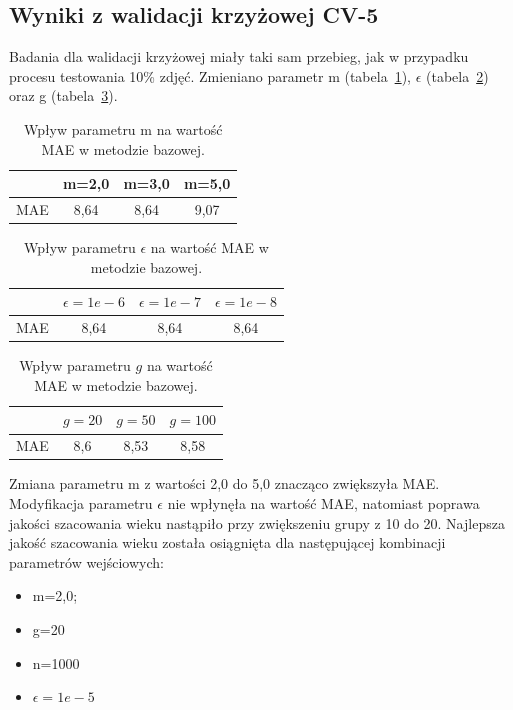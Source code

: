 \documentclass[a4paper,twoside,12pt]{book}
\begin{document}
    \subsection*{Wyniki z walidacji krzyżowej CV-5}
    Badania dla walidacji krzyżowej miały taki sam przebieg, jak w przypadku procesu testowania 10\% zdjęć.
    Zmieniano parametr m (tabela~\ref{tab.bazowa_m_cv}), $\epsilon$ (tabela~\ref{tab.bazowa_e_cv})
    oraz g (tabela~\ref{tab.bazowa_g_cv}).
    \begin{table}[h!]
        \centering
        \caption{Wpływ parametru m na wartość MAE w metodzie bazowej.}
        \begin{tabular}{|c|c|c|c|}
            \hline
            & m=2,0 & m=3,0 & m=5,0 \\ \hline
            MAE & 8,64 & 8,64 & 9,07 \\ \hline
        \end{tabular}
        \label{tab.bazowa_m_cv}
    \end{table}
    \begin{table}[h!]
        \centering
        \caption{Wpływ parametru $\epsilon$ na wartość MAE w metodzie bazowej.}
        \begin{tabular}{|c|c|c|c|}
            \hline
            & $\epsilon=1e-6$ & $\epsilon=1e-7$ & $\epsilon=1e-8$ \\ \hline
            MAE & 8,64 & 8,64 & 8,64 \\ \hline
        \end{tabular}
        \label{tab.bazowa_e_cv}
    \end{table}
    \begin{table}[h!]
        \centering
        \caption{Wpływ parametru $g$ na wartość MAE w metodzie bazowej.}
        \begin{tabular}{|c|c|c|c|}
            \hline
            & $g=20$ & $g=50$ & $g=100$ \\ \hline
            MAE & 8,6 & 8,53 & 8,58 \\ \hline
        \end{tabular}
        \label{tab.bazowa_g_cv}
    \end{table}
    Zmiana parametru m z wartości 2,0 do 5,0 znacząco zwiększyła MAE. Modyfikacja parametru $\epsilon$ nie wpłynęła
    na wartość MAE, natomiast poprawa jakości szacowania wieku nastąpiło przy zwiększeniu grupy z 10 do 20.
    Najlepsza jakość szacowania wieku została osiągnięta dla następującej kombinacji parametrów wejściowych:
    \begin{itemize}
        \item m=2,0;
        \item g=20
        \item n=1000
        \item $\epsilon=1e-5$
    \end{itemize}
\end{document}
